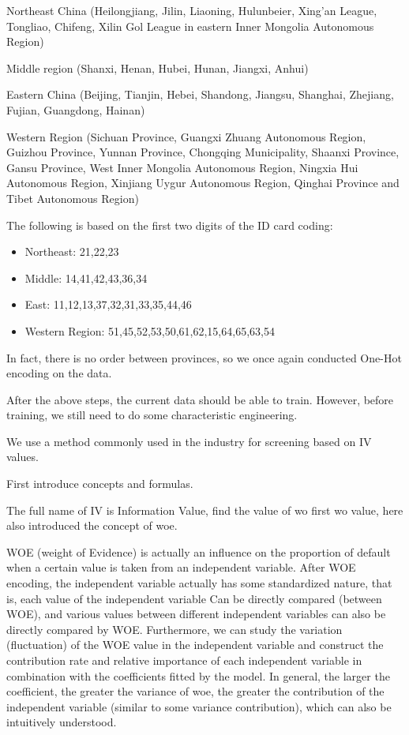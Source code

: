 \documentclass{mcmthesis}
\begin{document}
Northeast China (Heilongjiang, Jilin, Liaoning, Hulunbeier, Xing'an League, Tongliao, Chifeng, Xilin Gol League in eastern Inner Mongolia Autonomous Region)

Middle region (Shanxi, Henan, Hubei, Hunan, Jiangxi, Anhui)

Eastern China (Beijing, Tianjin, Hebei, Shandong, Jiangsu, Shanghai, Zhejiang, Fujian, Guangdong, Hainan)

Western Region (Sichuan Province, Guangxi Zhuang Autonomous Region, Guizhou Province, Yunnan Province, Chongqing Municipality, Shaanxi Province, Gansu Province, West Inner Mongolia Autonomous Region, Ningxia Hui Autonomous Region, Xinjiang Uygur Autonomous Region, Qinghai Province and Tibet Autonomous Region)

The following is based on the first two digits of the ID card coding:
\begin{itemize}
  \item Northeast: 21,22,23
  \item Middle: 14,41,42,43,36,34
  \item East: 11,12,13,37,32,31,33,35,44,46  
  \item Western Region: 51,45,52,53,50,61,62,15,64,65,63,54
\end{itemize}

In fact, there is no order between provinces, so we once again conducted One-Hot encoding on the data.

After the above steps, the current data should be able to train. However, before training, we still need to do some characteristic engineering.

We use a method commonly used in the industry for screening based on IV values.

First introduce concepts and formulas.

The full name of IV is Information Value, find the value of wo first wo value, here also introduced the concept of woe.

WOE (weight of Evidence) is actually an influence on the proportion of default when a certain value is taken from an independent variable. After WOE encoding, the independent variable actually has some standardized nature, that is, each value of the independent variable Can be directly compared (between WOE), and various values ​​between different independent variables can also be directly compared by WOE. Furthermore, we can study the variation (fluctuation) of the WOE value in the independent variable and construct the contribution rate and relative importance of each independent variable in combination with the coefficients fitted by the model. In general, the larger the coefficient, the greater the variance of woe, the greater the contribution of the independent variable (similar to some variance contribution), which can also be intuitively understood.
\end{document}
